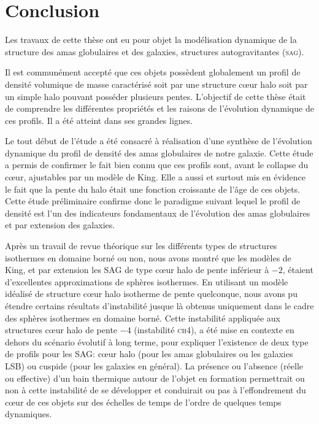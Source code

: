 \section{Conclusion}

Les travaux de cette thèse ont eu pour objet la modélisation dynamique de la structure des amas globulaires et des galaxies, structures
autogravitantes (\textsc{sag}). 



Il est communément accepté que ces objets possèdent globalement un profil de densité volumique de masse caractérisé soit par une structure cœur halo
soit par un simple halo pouvant posséder plusieurs pentes. L'objectif de cette thèse était de comprendre les différentes propriétés et les raisons de
l'évolution dynamique de ces profils. Il a été atteint dans ses grandes lignes.



Le tout début de l'étude a été consacré à réalisation d'une synthèse de l'évolution dynamique du profil de densité des amas globulaires de notre
galaxie. Cette étude a permis de confirmer le fait bien connu que ces profils sont, avant le collapse du cœur, ajustables par un modèle de King. Elle
a aussi et surtout mis en évidence le fait que la pente du halo était une fonction croissante de l'âge de ces objets. Cette étude préliminaire
confirme donc le paradigme suivant lequel le profil de densité est l'un des indicateurs fondamentaux de l'évolution des amas globulaires et par
extension des galaxies.


Après un travail de revue théorique sur les différents types de structures isothermes en domaine borné ou non, nous avons montré que les modèles de
King, et par extension les \textsc{SAG} de type cœur halo de pente inférieur à $-2$, étaient d'excellentes approximations de sphères isothermes. En
utilisant un modèle idéalisé de structure cœur halo isotherme de pente quelconque, nous avons pu étendre certains résultats d'instabilité jusque là
obtenus uniquement dans le cadre des sphères isothermes en domaine borné. Cette instabilité appliquée aux structures cœur halo de pente $-4$
(instabilité \textsc{ch4}), a été mise en contexte  en dehors du scénario évolutif à long terme, pour expliquer l'existence de deux type de profils
pour les \textsc{SAG}: cœur halo (pour les amas globulaires ou les galaxies LSB) ou cuspide (pour les galaxies en général). La présence ou l'absence
(réelle ou effective) d'un bain thermique autour de l'objet en formation permettrait ou non à cette instabilité de se développer et conduirait ou pas
à l'effondrement du cœur de ces objets sur des échelles de temps de l'ordre de quelques temps dynamiques.



